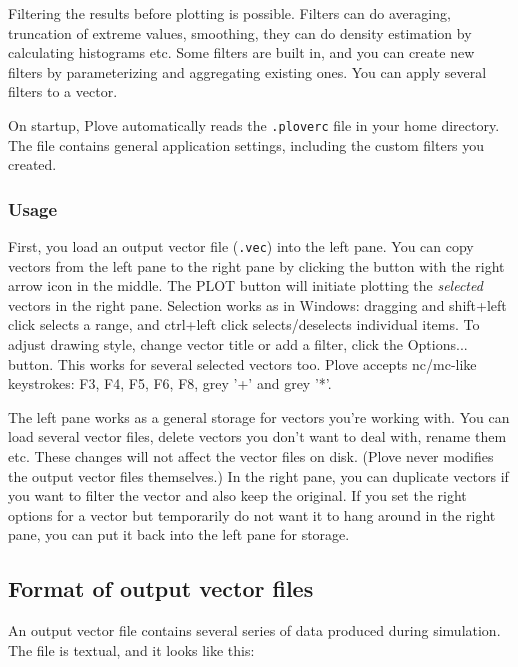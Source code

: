 Filtering the results before plotting is
possible. Filters can do averaging, truncation of extreme values,
smoothing, they can do density estimation by
calculating histograms etc. Some filters are built
in, and you can create new filters by parameterizing and aggregating existing ones.
You can apply several filters to a vector.

On startup, Plove automatically reads the \texttt{.ploverc} file in
your home directory. The file contains general application settings,
including the custom filters you created.




\subsubsection{Usage}

First, you load an output vector file (\texttt{.vec}) into the left
pane. You can copy vectors from the left
pane to the right pane by clicking the button with the right arrow icon
in the middle.
The PLOT button will initiate plotting the \textit{selected}
vectors in the right pane. Selection works as in Windows: dragging
and shift+left click selects a range, and ctrl+left click selects/deselects
individual items. To adjust drawing style, change vector title or add
a filter, click the Options... button. This works for several selected
vectors too. Plove accepts nc/mc-like keystrokes: F3, F4, F5, F6, F8,
grey '+' and grey '*'.


The left pane works as a general storage for vectors you're working
with. You can load several vector files, delete vectors you don't
want to deal with, rename them etc. These changes will not affect
the vector files on disk.
(Plove never modifies the output vector files themselves.)
In the right pane, you can duplicate
vectors if you want to filter the vector and also keep the original.
If you set the right options for a vector but temporarily do
not want it to hang around in the right pane, you can put it
back into the left pane for storage.



\subsection{Format of output vector files}

An output vector file contains several
series of data produced during simulation. The file is textual, and it
looks like this:


